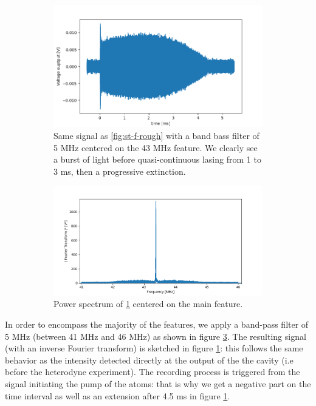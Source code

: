 \documentclass[11pt]{report}
\begin{document}
\begin{figure}[h!]
\centering
\begin{subfigure}{.48\textwidth}
  \centering
  \includegraphics[width=1.1\linewidth]{sp-f-bpf}
  \caption{Same signal as \ref{fig:st-f-rough} with a band bass filter of 5 MHz centered on the 43 MHz feature. We clearly see a burst of light before quasi-continuous lasing from 1 to 3 ms, then a progressive extinction.}
  \label{fig:sp-f-bpf}
\end{subfigure}%
\hspace{1em}%
\begin{subfigure}{.48\textwidth}
  \centering
  \includegraphics[width=1.1\linewidth]{sp-fft-bpf}
  \caption{Power spectrum of \ref{fig:sp-f-bpf} centered on the main feature.}
  \label{fig:sp-fft-bpf}
\end{subfigure}
\caption{}
\end{figure}

In order to encompass the majority of the features, we apply a band-pass filter of 5 MHz (between 41 MHz and 46 MHz) as shown in figure \ref{fig:sp-fft-bpf}. The resulting signal (with an inverse Fourier transform) is sketched in figure \ref{fig:sp-f-bpf}: this follows the same behavior as the intensity detected directly at the output of the the cavity (i.e before the heterodyne experiment). The recording process is triggered from the signal initiating the pump of the atoms: that is why we get a negative part on the time interval as well as an extension after 4.5 ms in figure \ref{fig:sp-f-bpf}.
\end{document}
